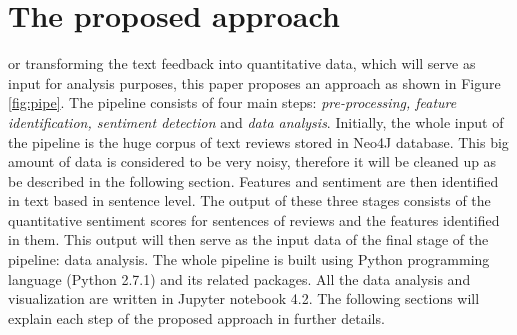 
%
%
\let\textcircled=\pgftextcircled
\chapter{The proposed approach}

\label{chap:prop}

or transforming the text feedback into quantitative data, which will serve as input for analysis purposes, this paper proposes an approach as shown in Figure \ref{fig:pipe}. The pipeline consists of four main steps: \textit{pre-processing, feature identification, sentiment detection}  and \textit{data analysis}. Initially, the whole input of the pipeline is the huge corpus of text reviews stored in Neo4J database. This big amount of data is considered to be very noisy, therefore it will be cleaned up as be described in the following section. Features and sentiment are then identified in text based in sentence level. The output of these three stages consists of the quantitative sentiment scores for sentences of reviews and the features identified in them. This output will then serve as the input data of the final stage of the pipeline: data analysis.  
The whole pipeline is built using Python programming language (Python 2.7.1) and its related packages. All the data analysis and visualization are written in Jupyter notebook 4.2. The following sections will explain each step of the proposed approach in further details.
%
%
%
